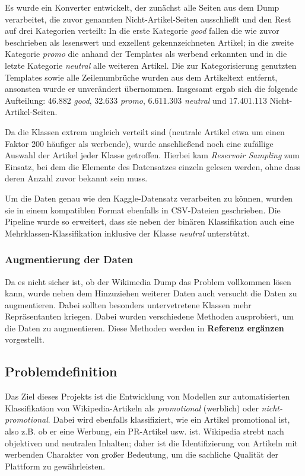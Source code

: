 Es wurde ein Konverter entwickelt, der zunächst alle Seiten aus dem Dump verarbeitet, die zuvor genannten Nicht-Artikel-Seiten ausschließt und den Rest auf drei Kategorien verteilt: In die erste Kategorie \emph{good} fallen die wie zuvor beschrieben als lesenswert und exzellent gekennzeichneten Artikel; in die zweite Kategorie \emph{promo} die anhand der Templates als werbend erkannten und in die letzte Kategorie \emph{neutral} alle weiteren Artikel. Die zur Kategorisierung genutzten Templates sowie alle Zeilenumbrüche wurden aus dem Artikeltext entfernt, ansonsten wurde er unverändert übernommen. Insgesamt ergab sich die folgende Aufteilung: 46.882 \emph{good}, 32.633 \emph{promo}, 6.611.303 \emph{neutral} und 17.401.113 Nicht-Artikel-Seiten.

Da die Klassen extrem ungleich verteilt sind (neutrale Artikel etwa um einen Faktor 200 häufiger als werbende), wurde anschließend noch eine zufällige Auswahl der Artikel jeder Klasse getroffen. Hierbei kam \textit{Reservoir Sampling} \cite{ReservoirSampling} zum Einsatz, bei dem die Elemente des Datensatzes einzeln gelesen werden, ohne dass deren Anzahl zuvor bekannt sein muss.

Um die Daten genau wie den Kaggle-Datensatz verarbeiten zu können, wurden sie in einem kompatiblen Format ebenfalls in CSV-Dateien geschrieben. Die Pipeline wurde so erweitert, dass sie neben der binären Klassifikation auch eine Mehrklassen-Klassifikation inklusive der Klasse \emph{neutral} unterstützt.

\subsubsection{Augmentierung der Daten}
Da es nicht sicher ist, ob der Wikimedia Dump das Problem vollkommen lösen kann, wurde neben dem Hinzuziehen weiterer Daten auch versucht die Daten zu augmentieren. Dabei sollten besonders untervetretene Klassen mehr Repräsentanten kriegen. Dabei wurden verschiedene Methoden ausprobiert, um die Daten zu augmentieren. Diese Methoden werden in \textbf{Referenz ergänzen} vorgestellt.

\subsection{Problemdefinition}
Das Ziel dieses Projekts ist die Entwicklung von Modellen zur automatisierten Klassifikation von Wikipedia-Artikeln als \emph{promotional} (werblich) oder \emph{nicht-promotional}. Dabei wird ebenfalls klassifiziert, wie ein Artikel promotional ist, also z.B. ob er eine Werbung, ein PR-Artikel usw. ist. Wikipedia strebt nach objektiven und neutralen Inhalten; daher ist die Identifizierung von Artikeln mit werbenden Charakter von großer Bedeutung, um die sachliche Qualität der Plattform zu gewährleisten.

